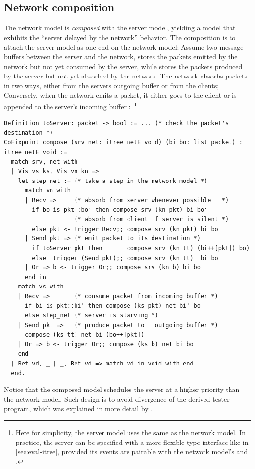 \subsection{Network composition}
\label{sec:net-compose}
The network model is {\em composed} with the server model, yielding a model that
exhibits the ``server delayed by the network'' behavior.  The composition is to
attach the server model as one end on the network model: Assume two message
buffers between the server and the network,  stores the packets emitted
by the network but not yet consumed by the server, while  stores the
packets produced by the server but not yet absorbed by the network.  The network
absorbs packets in two ways, either from the servers outgoing buffer  or
from the clients; Conversely, when the network emits a packet, it either goes to
the client or is appended to the server's incoming buffer
:~\footnote{Here for simplicity, the server model uses the same
   as the network model.  In practice, the server can be specified
  with a more flexible type interface like  in
  \autoref{sec:eval-itree}, provided its events are pairable with the network
  model's  and .}
\begin{lstlisting}[style=customcoq]
Definition toServer: packet -> bool := ... (* check the packet's destination *)
CoFixpoint compose (srv net: itree netE void) (bi bo: list packet) : itree netE void :=
  match srv, net with
  | Vis vs ks, Vis vn kn =>
    let step_net := (* take a step in the network model *)
      match vn with
      | Recv =>     (* absorb from server whenever possible   *)
        if bo is pkt::bo' then compose srv (kn pkt) bi bo'
                    (* absorb from client if server is silent *)
        else pkt <- trigger Recv;; compose srv (kn pkt) bi bo
      | Send pkt => (* emit packet to its destination *)
        if toServer pkt then       compose srv (kn tt) (bi++[pkt]) bo)
        else  trigger (Send pkt);; compose srv (kn tt)  bi bo
      | Or => b <- trigger Or;; compose srv (kn b) bi bo
      end in
    match vs with
    | Recv =>       (* consume packet from incoming buffer *)
      if bi is pkt::bi' then compose (ks pkt) net bi' bo
      else step_net (* server is starving *)
    | Send pkt =>   (* produce packet to   outgoing buffer *)
      compose (ks tt) net bi (bo++[pkt])
    | Or => b <- trigger Or;; compose (ks b) net bi bo
    end
  | Ret vd, _ | _, Ret vd => match vd in void with end
  end.
\end{lstlisting}
Notice that the composed model schedules the server at a higher priority than
the network model.  Such design is to avoid divergence of the derived tester
program, which was explained in more detail by \textcite{issta21}.

